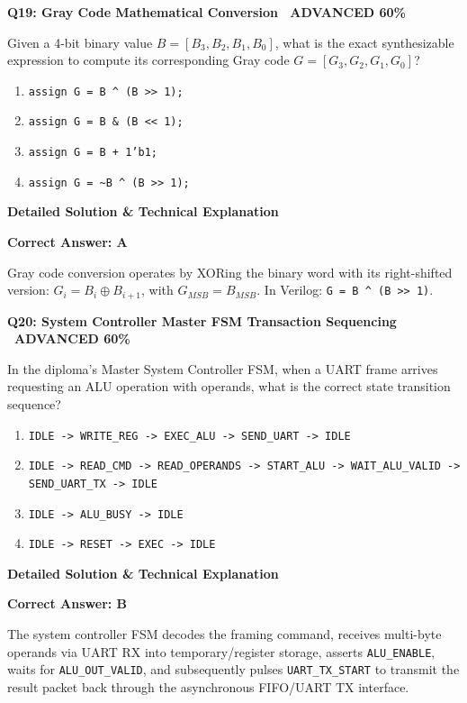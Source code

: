 \documentclass[11pt,a4paper]{article}
\newcommand{\badgeadv}{{\color{white}\colorbox{advred}{\bfseries\sffamily\tiny\ ADVANCED 60\%\ }}}
\newenvironment{qbox}[2]{%
  \begin{mdframed}[style=qstyle]%
  {\bfseries\sffamily\color{primaryblue}#1 \hfill #2}\par\vspace{2pt}%
}{%
  \end{mdframed}%
}
\newenvironment{ansbox}{%
  \begin{mdframed}[style=ansstyle]%
  {\bfseries\sffamily\color{ansgreen}\small Detailed Solution \& Technical Explanation}\par\vspace{2pt}\small%
}{%
  \end{mdframed}%
}
\begin{document}
\begin{qbox}{Q19: Gray Code Mathematical Conversion}{\badgeadv}
Given a 4-bit binary value $B = [B_3, B_2, B_1, B_0]$, what is the exact synthesizable expression to compute its corresponding Gray code $G = [G_3, G_2, G_1, G_0]$?
\begin{enumerate}[label=\textbf{\Alph*.}]
  \item \texttt{assign G = B \^{} (B >> 1);}
  \item \texttt{assign G = B \& (B << 1);}
  \item \texttt{assign G = B + 1'b1;}
  \item \texttt{assign G = \textasciitilde B \^{} (B >> 1);}
\end{enumerate}
\end{qbox}
\begin{ansbox}
\textbf{Correct Answer: A}

Gray code conversion operates by XORing the binary word with its right-shifted version: $G_i = B_i \oplus B_{i+1}$, with $G_{MSB} = B_{MSB}$. In Verilog: \texttt{G = B \^{} (B >> 1)}.
\end{ansbox}

\begin{qbox}{Q20: System Controller Master FSM Transaction Sequencing}{\badgeadv}
In the diploma's Master System Controller FSM, when a UART frame arrives requesting an ALU operation with operands, what is the correct state transition sequence?
\begin{enumerate}[label=\textbf{\Alph*.}]
  \item \texttt{IDLE -> WRITE\_REG -> EXEC\_ALU -> SEND\_UART -> IDLE}
  \item \texttt{IDLE -> READ\_CMD -> READ\_OPERANDS -> START\_ALU -> WAIT\_ALU\_VALID -> SEND\_UART\_TX -> IDLE}
  \item \texttt{IDLE -> ALU\_BUSY -> IDLE}
  \item \texttt{IDLE -> RESET -> EXEC -> IDLE}
\end{enumerate}
\end{qbox}
\begin{ansbox}
\textbf{Correct Answer: B}

The system controller FSM decodes the framing command, receives multi-byte operands via UART RX into temporary/register storage, asserts \texttt{ALU\_ENABLE}, waits for \texttt{ALU\_OUT\_VALID}, and subsequently pulses \texttt{UART\_TX\_START} to transmit the result packet back through the asynchronous FIFO/UART TX interface.
\end{ansbox}
\end{document}
